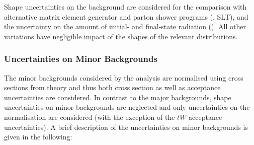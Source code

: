 Shape uncertainties on the \ttbar background are considered for the comparison
with alternative matrix element generator and parton shower programs (\hadhad,
\lephad SLT), and the uncertainty on the amount of initial- and final-state
radiation (\hadhad). All other variations have negligible impact of the shapes
of the relevant distributions.


\subsubsection{Uncertainties on Minor Backgrounds}

The minor backgrounds considered by the analysis are normalised using cross
sections from theory and thus both cross section as well as acceptance
uncertainties are considered. In contrast to the major backgrounds, shape
uncertainties on minor backgrounds are neglected and only uncertainties on the
normalisation are considered (with the exception of the $tW$ acceptance
uncertainties).  A brief description of the uncertainties on minor backgrounds
is given in the following:
